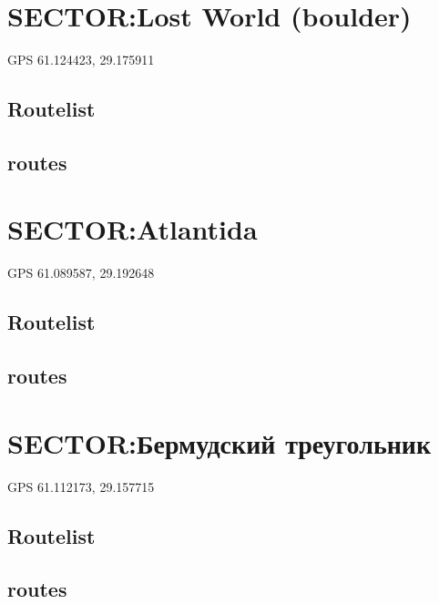 \documentclass[8pt, a5paper,notitlepage,openany]{report}
\begin{document}
\clearpage 
\chapter{SECTOR:Lost World (boulder)}
 GPS 61.124423, 29.175911
\section*{Routelist}

\newpage
\section*{routes}


\clearpage 
\chapter{SECTOR:Atlantida}
 GPS 61.089587, 29.192648
\section*{Routelist}

\newpage
\section*{routes}

 
\clearpage 
\chapter{SECTOR:Бермудский треугольник}
GPS 61.112173, 29.157715
\section*{Routelist}

\newpage
\section*{routes}





 
\end{document}
